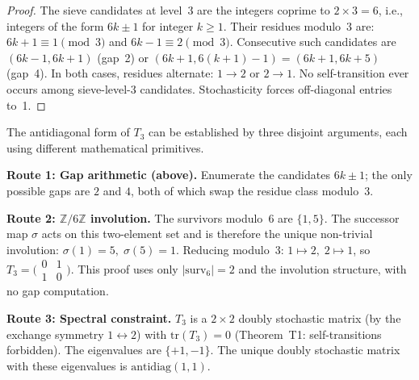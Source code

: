 \documentclass[12pt,a4paper]{article}
\begin{document}
\begin{proof}
The sieve candidates at level~3 are the integers coprime to $2 \times 3 = 6$,
i.e., integers of the form $6k \pm 1$ for integer $k \geq 1$. Their residues
modulo~3 are: $6k + 1 \equiv 1 \pmod 3$ and $6k - 1 \equiv 2 \pmod 3$.
Consecutive such candidates are $(6k-1, 6k+1)$ (gap~2) or $(6k+1, 6(k+1)-1) = (6k+1, 6k+5)$
(gap~4). In both cases, residues alternate: $1 \to 2$ or $2 \to 1$. No self-transition
ever occurs among sieve-level-3 candidates. Stochasticity forces off-diagonal entries to~1.
\end{proof}

\begin{remark}[Three independent routes to $T_3 = \mathrm{antidiag}(1,1)$]
\label{rem:T3_three_routes}
The antidiagonal form of $T_3$ can be established by three disjoint arguments,
each using different mathematical primitives.

\smallskip\noindent
\textbf{Route 1: Gap arithmetic (above).}
Enumerate the candidates $6k \pm 1$; the only possible gaps are $2$ and $4$,
both of which swap the residue class modulo~3.

\smallskip\noindent
\textbf{Route 2: $\mathbb{Z}/6\mathbb{Z}$ involution.}
The survivors modulo~$6$ are $\{1, 5\}$. The successor map $\sigma$ acts on
this two-element set and is therefore the unique non-trivial involution:
$\sigma(1) = 5,\; \sigma(5) = 1$. Reducing modulo~3:
$1 \mapsto 2,\; 2 \mapsto 1$, so
$T_3 = \bigl(\begin{smallmatrix} 0 & 1 \\ 1 & 0 \end{smallmatrix}\bigr)$.
This proof uses only $|\mathrm{surv}_6| = 2$ and the involution structure,
with no gap computation.

\smallskip\noindent
\textbf{Route 3: Spectral constraint.}
$T_3$ is a $2 \times 2$ doubly stochastic matrix (by the exchange symmetry
$1 \leftrightarrow 2$) with $\mathrm{tr}(T_3) = 0$ (Theorem~T1:
self-transitions forbidden). The eigenvalues are $\{+1, -1\}$.
The unique doubly stochastic matrix with these eigenvalues is
$\mathrm{antidiag}(1,1)$.
\end{remark}
\end{document}

